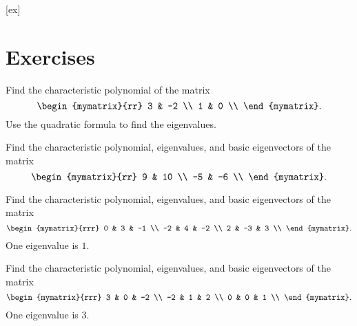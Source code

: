 [ex]
\section*{Exercises}

\begin{enumialphparenastyle}

\begin{ex}
  Find the characteristic polynomial of the matrix
  \begin{equation*}
    \begin{mymatrix}{rr}
      3 &  -2 \\
      1 &   0 \\
    \end{mymatrix}.
  \end{equation*}
  Use the quadratic formula to find the eigenvalues.
\end{ex}

\begin{ex}
  Find the characteristic polynomial, eigenvalues, and basic
  eigenvectors of the matrix
  \begin{equation*}
    \begin{mymatrix}{rr}
      9 &  10 \\
      -5 &  -6 \\
    \end{mymatrix}.
  \end{equation*}
\end{ex}

\begin{ex}
  Find the characteristic polynomial, eigenvalues, and basic
  eigenvectors of the matrix
  \begin{equation*}
    \begin{mymatrix}{rrr}
      0 &   3 &  -1 \\
      -2 &   4 &  -2 \\
      2 &  -3 &   3 \\
    \end{mymatrix}.
  \end{equation*}
  One eigenvalue is $1$.
\end{ex}

\begin{ex}
  Find the characteristic polynomial, eigenvalues, and basic
  eigenvectors of the matrix
  \begin{equation*}
    \begin{mymatrix}{rrr}
      3 &   0 &  -2 \\
      -2 &   1 &   2 \\
      0 &   0 &   1 \\
    \end{mymatrix}.
  \end{equation*}
  One eigenvalue is $3$.
\end{ex}


\end{enumialphparenastyle}
